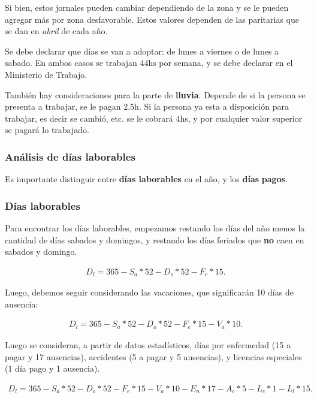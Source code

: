 \documentclass[../main.tex]{subfiles}
\begin{document}
Si bien, estos jornales pueden cambiar dependiendo de la zona y se le pueden agregar
más por zona desfavorable. Estos valores dependen de las paritarias que se dan en
\textit{abril} de cada año.

Se debe declarar que días se van a adoptar: de lunes a viernes o de lunes a sabado.
En ambos casos se trabajan 44hs por semana, y se debe declarar en el Ministerio
de Trabajo.

También hay consideraciones para la parte de \textbf{lluvia}. Depende de si la 
persona se presenta a trabajar, se le pagan 2.5h. Si la persona ya esta a disposición
para trabajar, es decir se cambió, etc. se le cobrará 4hs, y por cualquier valor
superior se pagará lo trabajado.

\subsubsection{Análisis de días laborables}

Es importante distinguir entre \textbf{días laborables} en el año, y los \textbf{días}
\textbf{pagos}. 

\subsubsection{Días laborables}

Para encontrar los días laborables, empezamos restando los días del año menos
la cantidad de días sabados y domingos, y restando los días feriados que \textbf{no}
caen en sabados y domingo.

\begin{align*}
  D_l = 365 - S_a * 52 - D_o * 52 - F_e * 15
.\end{align*}

Luego, debemos seguir considerando las vacaciones, que significarán 10 días
de ausencia:

\begin{align*}
  D_l = 365 - S_a * 52 - D_o * 52 - F_e * 15 - V_a * 10
.\end{align*}

Luego se consideran, a partir de datos estadísticos, días por enfermedad (15 a pagar
y 17 ausencias), accidentes (5 a pagar y 5 ausencias), y licencias especiales
(1 día pago y 1 ausencia).

\begin{align*}
  D_l = 365 - S_a * 52 - D_o * 52 - F_e * 15 - V_a * 10 - E_n * 17 - A_c * 5 - L_e * 1 - L_l * 15 
.\end{align*}
\end{document}
